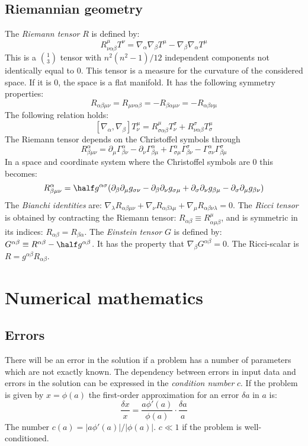 \section{Riemannian geometry}
The {\it Riemann tensor} $R$ is defined by:
\[
R^\mu_{\nu\alpha\beta}T^\nu=\nabla_\alpha\nabla_\beta T^\mu-\nabla_\beta\nabla_\alpha T^\mu
\]
This is a $1\choose 3$ tensor with $n^2(n^2-1)/12$ independent components not
identically equal to 0. This tensor is a measure for the curvature of the
considered space. If it is 0, the space is a flat manifold. It has the
following symmetry properties:
\[
R_{\alpha\beta\mu\nu}=R_{\mu\nu\alpha\beta}=-R_{\beta\alpha\mu\nu}=-R_{\alpha\beta\nu\mu}
\]
The following relation holds:
\[
[\nabla_\alpha,\nabla_\beta]T_\nu^\mu=R_{\sigma\alpha\beta}^\mu T_\nu^\sigma+R_{\nu\alpha\beta}^\sigma T_\sigma^\mu
\]
The Riemann tensor depends on the Christoffel symbols through
\[
R^\alpha_{\beta\mu\nu}=\partial_\mu\Gamma^\alpha_{\beta\nu}-\partial_\nu\Gamma^\alpha_{\beta\mu}+\Gamma^\alpha_{\sigma\mu}\Gamma^\sigma_{\beta\nu}-\Gamma^\alpha_{\sigma\nu}\Gamma^\sigma_{\beta\mu}
\]
In a space and coordinate system where the Christoffel symbols are 0 this
becomes:
\[
R^\alpha_{\beta\mu\nu}=\half g^{\alpha\sigma}(\partial_\beta\partial_\mu g_{\sigma\nu}-\partial_\beta\partial_\nu g_{\sigma\mu}+\partial_\sigma\partial_\nu g_{\beta\mu}-\partial_\sigma\partial_\mu g_{\beta\nu})
\]
The {\it Bianchi identities} are: $\nabla_\lambda R_{\alpha\beta\mu\nu}+\nabla_\nu R_{\alpha\beta\lambda\mu} +\nabla_\mu R_{\alpha\beta\nu\lambda}=0$.
\npar
The {\it Ricci tensor} is obtained by contracting the Riemann tensor:
$R_{\alpha\beta}\equiv R_{\alpha\mu\beta}^\mu$, and is symmetric in its
indices: $R_{\alpha\beta}=R_{\beta\alpha}$. The {\it Einstein tensor} $G$ is
defined by: $G^{\alpha\beta}\equiv R^{\alpha\beta}-\half g^{\alpha\beta}$.
It has the property that $\nabla_\beta G^{\alpha\beta}=0$. The Ricci-scalar is
$R=g^{\alpha\beta}R_{\alpha\beta}$.


\chapter{Numerical mathematics}
\label{chap:num}
\section{Errors}
There will be an error in the solution if a problem has a number of parameters
which are not exactly known. The dependency between errors in input data and
errors in the solution can be expressed in the {\it condition number} $c$. If
the problem is given by $x=\phi(a)$ the first-order approximation for an error
$\delta a$ in $a$ is:
\[
\frac{\delta x}{x}=\frac{a\phi'(a)}{\phi(a)}\cdot\frac{\delta a}{a}
\]
The number $c(a)=|a\phi'(a)|/|\phi(a)|$. $c\ll1$ if the problem is
well-conditioned.

